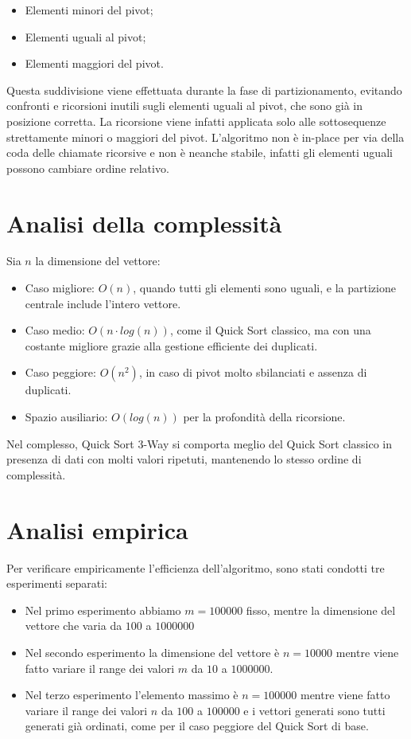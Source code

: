 \documentclass[a4paper, 12pt, oneside]{book}
\begin{document}
\begin{itemize}
    \item Elementi minori del pivot;
    \item Elementi uguali al pivot;
    \item Elementi maggiori del pivot.
\end{itemize}

\noindent Questa suddivisione viene effettuata durante la fase di partizionamento, evitando confronti e ricorsioni inutili sugli elementi uguali al pivot, che sono già in posizione corretta. La ricorsione viene infatti applicata solo alle sottosequenze strettamente minori o maggiori del pivot.
L'algoritmo non è in-place per via della coda delle chiamate ricorsive e non è neanche stabile, infatti gli elementi uguali possono cambiare ordine relativo.

\section{Analisi della complessità}

Sia \(n\) la dimensione del vettore:

\begin{itemize}
    \item Caso migliore: \(O(n)\), quando tutti gli elementi sono uguali, e la partizione centrale include l'intero vettore.
    \item Caso medio: \(O(n \cdot log(n))\), come il Quick Sort classico, ma con una costante migliore grazie alla gestione efficiente dei duplicati.
    \item Caso peggiore: \(O(n^2)\), in caso di pivot molto sbilanciati e assenza di duplicati.
    \item Spazio ausiliario: \(O(log(n))\) per la profondità della ricorsione.
\end{itemize}

\noindent Nel complesso, Quick Sort 3-Way si comporta meglio del Quick Sort classico in presenza di dati con molti valori ripetuti, mantenendo lo stesso ordine di complessità.

\section{Analisi empirica}

Per verificare empiricamente l'efficienza dell'algoritmo, sono stati condotti tre esperimenti separati:

\begin{itemize}
    \item Nel primo esperimento abbiamo \(m = 100000\) fisso, mentre la dimensione del vettore che varia da \(100\) a $1000000$
    \item Nel secondo esperimento la dimensione del vettore è \(n = 10000\) mentre viene fatto variare il range dei valori \(m\) da $10$ a $1000000$.
    \item Nel terzo esperimento l'elemento massimo è \(n = 100000\) mentre viene fatto variare il range dei valori \(n\) da $100$ a $100000$ e i vettori generati sono tutti generati già ordinati, come per il caso peggiore del Quick Sort di base.
\end{itemize}
\end{document}
